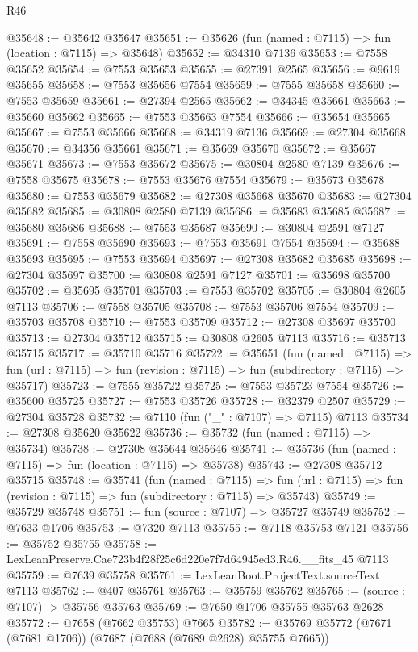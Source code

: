\begin{lexlean}{R46}
\begin{coremodule}
@35648 := @35642 @35647
@35651 := @35626 (fun (named : @7115) => fun (location : @7115) => @35648)
@35652 := @34310 @7136
@35653 := @7558 @35652
@35654 := @7553 @35653
@35655 := @27391 @2565
@35656 := @9619 @35655
@35658 := @7553 @35656 @7554
@35659 := @7555 @35658
@35660 := @7553 @35659
@35661 := @27394 @2565
@35662 := @34345 @35661
@35663 := @35660 @35662
@35665 := @7553 @35663 @7554
@35666 := @35654 @35665
@35667 := @7553 @35666
@35668 := @34319 @7136
@35669 := @27304 @35668
@35670 := @34356 @35661
@35671 := @35669 @35670
@35672 := @35667 @35671
@35673 := @7553 @35672
@35675 := @30804 @2580 @7139
@35676 := @7558 @35675
@35678 := @7553 @35676 @7554
@35679 := @35673 @35678
@35680 := @7553 @35679
@35682 := @27308 @35668 @35670
@35683 := @27304 @35682
@35685 := @30808 @2580 @7139
@35686 := @35683 @35685
@35687 := @35680 @35686
@35688 := @7553 @35687
@35690 := @30804 @2591 @7127
@35691 := @7558 @35690
@35693 := @7553 @35691 @7554
@35694 := @35688 @35693
@35695 := @7553 @35694
@35697 := @27308 @35682 @35685
@35698 := @27304 @35697
@35700 := @30808 @2591 @7127
@35701 := @35698 @35700
@35702 := @35695 @35701
@35703 := @7553 @35702
@35705 := @30804 @2605 @7113
@35706 := @7558 @35705
@35708 := @7553 @35706 @7554
@35709 := @35703 @35708
@35710 := @7553 @35709
@35712 := @27308 @35697 @35700
@35713 := @27304 @35712
@35715 := @30808 @2605 @7113
@35716 := @35713 @35715
@35717 := @35710 @35716
@35722 := @35651
    (fun (named : @7115) =>
    fun (url : @7115) => fun (revision : @7115) => fun (subdirectory : @7115) => @35717)
@35723 := @7555 @35722
@35725 := @7553 @35723 @7554
@35726 := @35600 @35725
@35727 := @7553 @35726
@35728 := @32379 @2507
@35729 := @27304 @35728
@35732 := @7110 (fun ("_" : @7107) => @7115) @7113
@35734 := @27308 @35620 @35622
@35736 := @35732 (fun (named : @7115) => @35734)
@35738 := @27308 @35644 @35646
@35741 := @35736 (fun (named : @7115) => fun (location : @7115) => @35738)
@35743 := @27308 @35712 @35715
@35748 := @35741
    (fun (named : @7115) =>
    fun (url : @7115) => fun (revision : @7115) => fun (subdirectory : @7115) => @35743)
@35749 := @35729 @35748
@35751 := fun (source : @7107) => @35727 @35749
@35752 := @7633 @1706
@35753 := @7320 @7113
@35755 := @7118 @35753 @7121
@35756 := @35752 @35755
@35758 := LexLeanPreserve.Cae723b4f28f25c6d220e7f7d64945ed3.R46.__fits_45 @7113
@35759 := @7639 @35758
@35761 := LexLeanBoot.ProjectText.sourceText @7113
@35762 := @407 @35761
@35763 := @35759 @35762
@35765 := (source : @7107) -> @35756 @35763
@35769 := @7650 @1706 @35755 @35763 @2628
@35772 := @7658 (@7662 @35753) @7665
@35782 := @35769 @35772 (@7671 (@7681 @1706)) (@7687 (@7688 (@7689 @2628) @35755 @7665))

\end{coremodule}
\end{lexlean}
